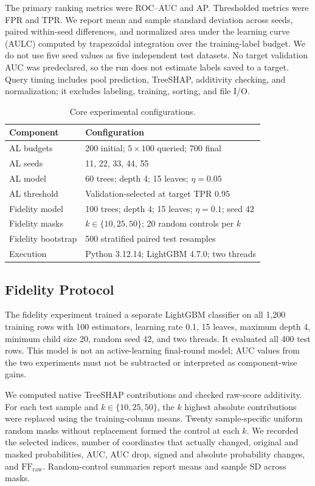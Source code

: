 The primary ranking metrics were ROC--AUC and AP. Thresholded metrics were FPR
and TPR. We report mean and sample standard deviation across seeds, paired
within-seed differences, and normalized area under the learning curve (AULC)
computed by trapezoidal integration over the training-label budget. We do not use
five seed values as five independent test datasets. No target validation AUC was
predeclared, so the run does not estimate labels saved to a target. Query timing
includes pool prediction, TreeSHAP, additivity checking, and normalization; it
excludes labeling, training, sorting, and file I/O.

\begin{table}[t]
\centering
\caption{Core experimental configurations.}
\label{tab:configuration}
\small
\begin{tabular}{p{2.4cm}p{4.6cm}}
\toprule
Component & Configuration \\
\midrule
AL budgets & 200 initial; $5\times100$ queried; 700 final \\
AL seeds & 11, 22, 33, 44, 55 \\
AL model & 60 trees; depth 4; 15 leaves; $\eta=0.05$ \\
AL threshold & Validation-selected at target TPR 0.95 \\
Fidelity model & 100 trees; depth 4; 15 leaves; $\eta=0.1$; seed 42 \\
Fidelity masks & $k\in\{10,25,50\}$; 20 random controls per $k$ \\
Fidelity bootstrap & 500 stratified paired test resamples \\
Execution & Python 3.12.14; LightGBM 4.7.0; two threads \\
\bottomrule
\end{tabular}
\end{table}

\subsection{Fidelity Protocol}

The fidelity experiment trained a separate LightGBM classifier on all 1,200
training rows with 100 estimators, learning rate 0.1, 15 leaves, maximum depth 4,
minimum child size 20, random seed 42, and two threads. It evaluated all 400 test
rows. This model is not an active-learning final-round model; AUC values from the
two experiments must not be subtracted or interpreted as component-wise gains.

We computed native TreeSHAP contributions and checked raw-score additivity. For
each test sample and $k\in\{10,25,50\}$, the $k$ highest absolute contributions
were replaced using the training-column means. Twenty sample-specific uniform
random masks without replacement formed the control at each $k$. We recorded
the selected indices, number of coordinates that actually changed, original and
masked probabilities, AUC, AUC drop, signed and absolute probability changes,
and $\mathrm{FF}_{\mathrm{raw}}$. Random-control summaries report means and
sample SD across masks.

